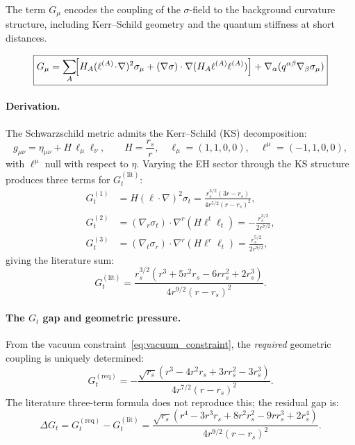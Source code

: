 \documentclass[11pt,a4paper]{article}
\theoremstyle{plain}
\theoremstyle{definition}
\theoremstyle{remark}
\newcommand{\sigt}{\sigma_t}
\newcommand{\rs}{r_s}
\begin{document}
The term $G_\mu$ encodes the coupling of the $\sigma$-field to the background curvature
structure, including Kerr--Schild geometry and the quantum stiffness at short distances.

\begin{equation}
  \boxed{G_\mu
    = \sum_A\!\Bigl[H_A(\ell^{(A)}\!\cdot\!\nabla)^2\sigma_\mu
      + (\nabla\sigma)\cdot\nabla(H_A\ell^{(A)}\ell^{(A)})\Bigr]
    + \nabla_\alpha(q^{\alpha\beta}\nabla_\beta\sigma_\mu)}
  \label{eq:G}
\end{equation}

\paragraph{Derivation.}
The Schwarzschild metric admits the Kerr--Schild (KS) decomposition:
\[
  g_{\mu\nu} = \eta_{\mu\nu} + H\,\ell_\mu\ell_\nu,
  \qquad H = \frac{\rs}{r},\quad
  \ell_\mu = (1,1,0,0),\quad
  \ell^\mu = (-1,1,0,0),
\]
with $\ell^\mu$ null with respect to $\eta$.  Varying the EH sector through the
KS structure produces three terms for $G_t^{(\mathrm{lit})}$:
\begin{align}
  G_t^{(1)} &= H(\ell\cdot\nabla)^2\sigt
    = \frac{\rs^{3/2}(3r-\rs)}{4r^{5/2}(r-\rs)^2},
    \label{eq:G1}\\
  G_t^{(2)} &= (\nabla_r\sigt)\cdot\nabla^r(H\ell^t\ell_t)
    = -\frac{\rs^{3/2}}{2r^{7/2}},
    \label{eq:G2}\\
  G_t^{(3)} &= (\nabla_t\sigma_r)\cdot\nabla^r(H\ell^r\ell_t)
    = \frac{\rs^{5/2}}{2r^{9/2}},
    \label{eq:G3}
\end{align}
giving the literature sum:
\begin{equation}
  G_t^{(\mathrm{lit})} = \frac{\rs^{3/2}(r^3+5r^2\rs-6r\rs^2+2\rs^3)}
                              {4r^{9/2}(r-\rs)^2}.
  \label{eq:Glit}
\end{equation}

\paragraph{The $G_t$ gap and geometric pressure.}
From the vacuum constraint~\eqref{eq:vacuum_constraint}, the \emph{required} geometric
coupling is uniquely determined:
\begin{equation}
  G_t^{(\mathrm{req})}
  = -\frac{\sqrt{\rs}(r^3 - 4r^2\rs + 3r\rs^2 - 3\rs^3)}{4r^{7/2}(r-\rs)^2}.
  \label{eq:Greq}
\end{equation}
The literature three-term formula does not reproduce this; the residual gap is:
\begin{equation}
  \Delta G_t = G_t^{(\mathrm{req})} - G_t^{(\mathrm{lit})}
  = \frac{\sqrt{\rs}(r^4-3r^3\rs+8r^2\rs^2-9r\rs^3+2\rs^4)}
         {4r^{9/2}(r-\rs)^2}.
  \label{eq:Ggap}
\end{equation}
\end{document}

